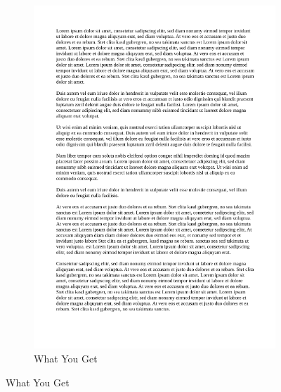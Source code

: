 \documentclass[18pt]{beamer}
\begin{document}
\begin{frame}
\begin{figure}
\begin{subfigure}{0.5\textwidth}
			\end{subfigure}%
			\begin{subfigure}{0.5\textwidth}
				\centering
				\caption{\small What You Get}
				\includegraphics[scale=0.2]{pics/tut1/wysiwyg.PNG}
			\end{subfigure}
		\end{figure}
	\end{frame}
\end{document}
